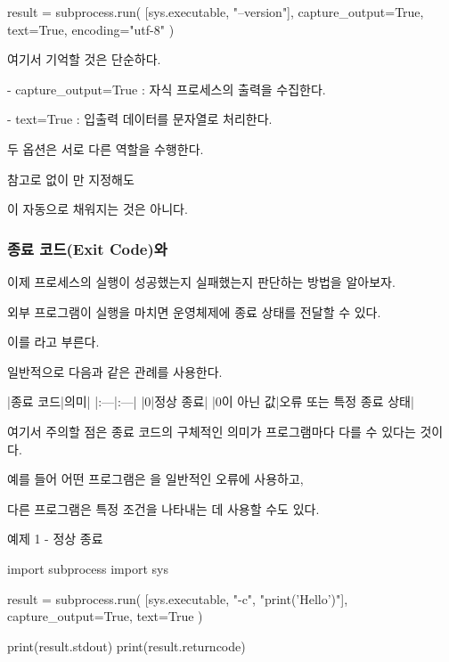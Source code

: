 \begin{dhkcode}
result = subprocess.run(
    [sys.executable, "--version"],
    capture_output=True,
    text=True,
    encoding="utf-8"
)
\end{dhkcode}

여기서 기억할 것은 단순하다.

\begin{dhknote}
\begin{dhksmry}
    - capture_output=True : 자식 프로세스의 출력을 수집한다.

    - text=True : 입출력 데이터를 문자열로 처리한다.
\end{dhksmry}
\end{dhknote}

두 옵션은 서로 다른 역할을 수행한다.

참고로  없이 만 지정해도

이 자동으로 채워지는 것은 아니다.

\subsubsection{종료 코드(Exit Code)와 }

이제 프로세스의 실행이 성공했는지 실패했는지 판단하는 방법을 알아보자.

외부 프로그램이 실행을 마치면 운영체제에 종료 상태를 전달할 수 있다.

이를 라고 부른다.

일반적으로 다음과 같은 관례를 사용한다.

\begin{dhktable}
|종료 코드|의미|
|:---|:---|
|0|정상 종료|
|0이 아닌 값|오류 또는 특정 종료 상태|
\end{dhktable}

여기서 주의할 점은 종료 코드의 구체적인 의미가 프로그램마다 다를 수 있다는 것이다.

예를 들어 어떤 프로그램은 을 일반적인 오류에 사용하고,

다른 프로그램은 특정 조건을 나타내는 데 사용할 수도 있다.

\begin{dhknote}
\begin{dhksmry}[centered]
예제 1 - 정상 종료
\end{dhksmry}
\end{dhknote}

\begin{dhkcode}
import subprocess
import sys

result = subprocess.run(
    [sys.executable, "-c", "print('Hello')"],
    capture_output=True,
    text=True
)

print(result.stdout)
print(result.returncode)
\end{dhkcode}

